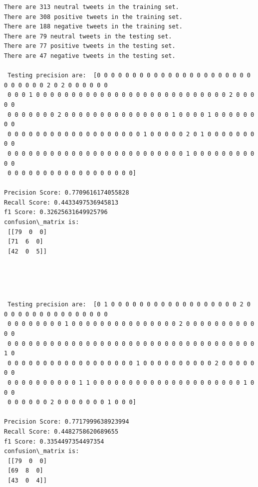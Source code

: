 \documentclass[11pt]{article}
\begin{document}
    \begin{Verbatim}[commandchars=\\\{\}]
There are 313 neutral tweets in the training set.
There are 308 positive tweets in the training set.
There are 188 negative tweets in the training set.
There are 79 neutral tweets in the testing set.
There are 77 positive tweets in the testing set.
There are 47 negative tweets in the testing set.

 Testing precision are:  [0 0 0 0 0 0 0 0 0 0 0 0 0 0 0 0 0 0 0 0 0 0 0 0 0 0 0 0 2 0 2 0 0 0 0 0 0
 0 0 0 1 0 0 0 0 0 0 0 0 0 0 0 0 0 0 0 0 0 0 0 0 0 0 0 0 0 0 0 2 0 0 0 0 0
 0 0 0 0 0 0 0 2 0 0 0 0 0 0 0 0 0 0 0 0 0 0 0 1 0 0 0 0 1 0 0 0 0 0 0 0 0
 0 0 0 0 0 0 0 0 0 0 0 0 0 0 0 0 0 0 0 1 0 0 0 0 0 2 0 1 0 0 0 0 0 0 0 0 0
 0 0 0 0 0 0 0 0 0 0 0 0 0 0 0 0 0 0 0 0 0 0 0 0 0 1 0 0 0 0 0 0 0 0 0 0 0
 0 0 0 0 0 0 0 0 0 0 0 0 0 0 0 0 0 0] 

Precision Score: 0.7709616174055828
Recall Score: 0.4433497536945813
f1 Score: 0.32625631649925796
confusion\_matrix is: 
 [[79  0  0]
 [71  6  0]
 [42  0  5]] 


    \end{Verbatim}

    \begin{center}
    \end{center}
    { \hspace*{\fill} \\}
    
    \begin{Verbatim}[commandchars=\\\{\}]

 Testing precision are:  [0 1 0 0 0 0 0 0 0 0 0 0 0 0 0 0 0 0 0 0 2 0 0 0 0 0 0 0 0 0 0 0 0 0 0 0 0
 0 0 0 0 0 0 0 0 1 0 0 0 0 0 0 0 0 0 0 0 0 0 0 0 2 0 0 0 0 0 0 0 0 0 0 0 0
 0 0 0 0 0 0 0 0 0 0 0 0 0 0 0 0 0 0 0 0 0 0 0 0 0 0 0 0 0 0 0 0 0 0 0 1 0
 0 0 0 0 0 0 0 0 0 0 0 0 0 0 0 0 0 0 1 0 0 0 0 0 0 0 0 0 0 2 0 0 0 0 0 0 0
 0 0 0 0 0 0 0 0 0 0 1 1 0 0 0 0 0 0 0 0 0 0 0 0 0 0 0 0 0 0 0 0 0 1 0 0 0
 0 0 0 0 0 0 2 0 0 0 0 0 0 0 1 0 0 0] 

Precision Score: 0.7717999638923994
Recall Score: 0.4482758620689655
f1 Score: 0.3354497354497354
confusion\_matrix is: 
 [[79  0  0]
 [69  8  0]
 [43  0  4]] 


    \end{Verbatim}

    \begin{center}
    \end{center}
    { \hspace*{\fill} \\}
    
\end{document}

